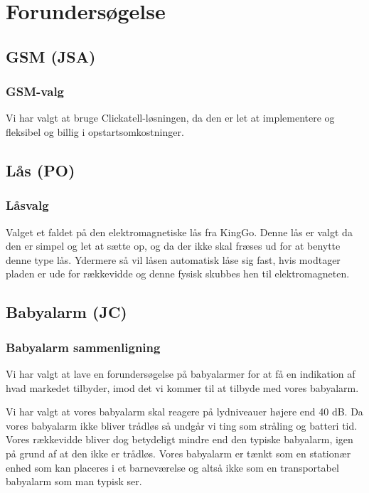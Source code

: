 \chapter{Forundersøgelse}

\section{GSM (JSA)}

\subsection{GSM-valg}
Vi har valgt at bruge Clickatell-løsningen, da den er let at implementere og fleksibel og billig i opstartsomkostninger.

\newpage
\section{Lås (PO)}

\subsection{Låsvalg}
Valget et faldet på den elektromagnetiske lås fra KingGo. Denne lås er valgt da den er simpel og let at sætte op, og da der ikke skal fræses ud for at benytte denne type lås. Ydermere så vil låsen automatisk låse sig fast, hvis modtager pladen er ude for rækkevidde og denne fysisk skubbes hen til elektromagneten.

\newpage
\section{Babyalarm (JC)}

\subsection{Babyalarm sammenligning}
Vi har valgt at lave en forundersøgelse på babyalarmer for at få en indikation af hvad markedet tilbyder, imod det vi kommer til at tilbyde med vores babyalarm.

Vi har valgt at vores babyalarm skal reagere på lydniveauer højere end 40 dB. Da vores babyalarm ikke bliver trådløs så undgår vi ting som stråling og batteri tid. Vores rækkevidde bliver dog betydeligt mindre end den typiske babyalarm, igen på grund af at den ikke er trådløs. Vores babyalarm er tænkt som en stationær enhed som kan placeres i et barneværelse og altså ikke som en transportabel babyalarm som man typisk ser.

